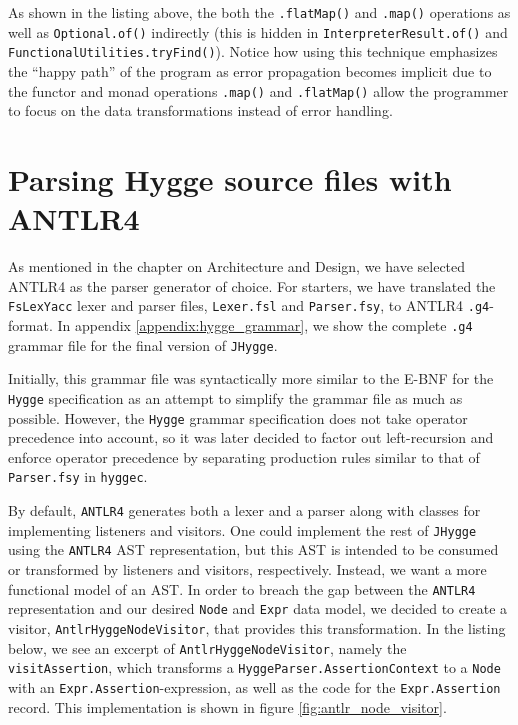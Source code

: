 As shown in the listing above, the both the \texttt{.flatMap()} and \texttt{.map()} operations as well as \texttt{Optional.of()}
indirectly (this is hidden in \texttt{InterpreterResult.of()} and \texttt{FunctionalUtilities.tryFind()}). Notice how using
this technique emphasizes the ``happy path'' of the program as error propagation becomes implicit due to the functor and monad
operations \texttt{.map()} and \texttt{.flatMap()} allow the programmer to focus on the data transformations instead of error
handling.

\section{Parsing Hygge source files with ANTLR4}

As mentioned in the chapter on Architecture and Design, we have selected ANTLR4 as the parser generator of choice. For starters,
we have translated the \texttt{FsLexYacc} lexer and parser files, \texttt{Lexer.fsl} and \texttt{Parser.fsy}, to ANTLR4
\texttt{.g4}-format. In appendix \ref{appendix:hygge_grammar}, we show the complete \texttt{.g4} grammar file for the final version of \texttt{JHygge}.

Initially, this grammar file was syntactically more similar to the E-BNF\cite{ebnf} for the \texttt{Hygge} specification\cite{lecture_notes} as an attempt to
simplify the grammar file as much as possible. However, the \texttt{Hygge} grammar specification does not take operator
precedence into account, so it was later decided to factor out left-recursion and enforce operator precedence by separating
production rules similar to that of \texttt{Parser.fsy} in \texttt{hyggec}\cite{hyggec}.

By default, \texttt{ANTLR4} generates both a lexer and a parser along with classes for implementing listeners and visitors\cite{antlr4_book}.
One could implement the rest of \texttt{JHygge} using the \texttt{ANTLR4} AST representation, but this AST is intended to
be consumed or transformed by listeners and visitors, respectively. Instead, we want a more functional model of an AST.
In order to breach the gap between the \texttt{ANTLR4} representation and our desired \texttt{Node} and \texttt{Expr} data model,
we decided to create a visitor, \texttt{AntlrHyggeNodeVisitor}, that provides this transformation. In the listing below, we
see an excerpt of \texttt{AntlrHyggeNodeVisitor}, namely the \texttt{visitAssertion}, which transforms a \texttt{HyggeParser.AssertionContext}
to a \texttt{Node} with an \texttt{Expr.Assertion}-expression, as well as the code for the \texttt{Expr.Assertion} record.
This implementation is shown in figure \ref{fig:antlr_node_visitor}.

